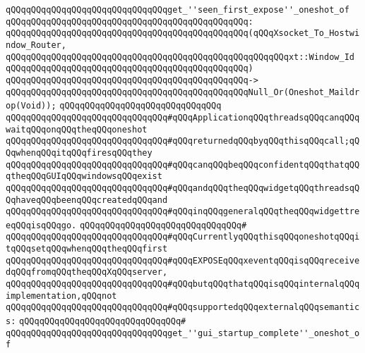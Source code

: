 \verb|qQQqqQQqqQQqqQQqqQQqqQQqqQQqqQQqget_''seen_first_expose''_oneshot_of|\newline
\verb|qQQqqQQqqQQqqQQqqQQqqQQqqQQqqQQqqQQqqQQqqQQqqQQq:|\newline
\verb|qQQqqQQqqQQqqQQqqQQqqQQqqQQqqQQqqQQqqQQqqQQqqQQq(qQQqXsocket_To_Hostwindow_Router,|\newline
\verb|qQQqqQQqqQQqqQQqqQQqqQQqqQQqqQQqqQQqqQQqqQQqqQQqqQQqqQQqxt::Window_Id|\newline
\verb|qQQqqQQqqQQqqQQqqQQqqQQqqQQqqQQqqQQqqQQqqQQqqQQq)|\newline
\verb|qQQqqQQqqQQqqQQqqQQqqQQqqQQqqQQqqQQqqQQqqQQqqQQq->|\newline
\verb|qQQqqQQqqQQqqQQqqQQqqQQqqQQqqQQqqQQqqQQqqQQqqQQqNull_Or(Oneshot_Maildrop(Void));|\newline
\newline
\verb|qQQqqQQqqQQqqQQqqQQqqQQqqQQqqQQq|\newline
\verb|qQQqqQQqqQQqqQQqqQQqqQQqqQQqqQQq#qQQqApplicationqQQqthreadsqQQqcanqQQqwaitqQQqonqQQqtheqQQqoneshot|\newline
\verb|qQQqqQQqqQQqqQQqqQQqqQQqqQQqqQQq#qQQqreturnedqQQqbyqQQqthisqQQqcall;qQQqwhenqQQqitqQQqfiresqQQqthey|\newline
\verb|qQQqqQQqqQQqqQQqqQQqqQQqqQQqqQQq#qQQqcanqQQqbeqQQqconfidentqQQqthatqQQqtheqQQqGUIqQQqwindowsqQQqexist|\newline
\verb|qQQqqQQqqQQqqQQqqQQqqQQqqQQqqQQq#qQQqandqQQqtheqQQqwidgetqQQqthreadsqQQqhaveqQQqbeenqQQqcreatedqQQqand|\newline
\verb|qQQqqQQqqQQqqQQqqQQqqQQqqQQqqQQq#qQQqinqQQqgeneralqQQqtheqQQqwidgettreeqQQqisqQQqgo.|\newline
\verb|qQQqqQQqqQQqqQQqqQQqqQQqqQQqqQQq#|\newline
\verb|qQQqqQQqqQQqqQQqqQQqqQQqqQQqqQQq#qQQqCurrentlyqQQqthisqQQqoneshotqQQqitqQQqsetqQQqwhenqQQqtheqQQqfirst|\newline
\verb|qQQqqQQqqQQqqQQqqQQqqQQqqQQqqQQq#qQQqEXPOSEqQQqxeventqQQqisqQQqreceivedqQQqfromqQQqtheqQQqXqQQqserver,|\newline
\verb|qQQqqQQqqQQqqQQqqQQqqQQqqQQqqQQq#qQQqbutqQQqthatqQQqisqQQqinternalqQQqimplementation,qQQqnot|\newline
\verb|qQQqqQQqqQQqqQQqqQQqqQQqqQQqqQQq#qQQqsupportedqQQqexternalqQQqsemantics:|\newline
\verb|qQQqqQQqqQQqqQQqqQQqqQQqqQQqqQQq#|\newline
\verb|qQQqqQQqqQQqqQQqqQQqqQQqqQQqqQQqget_''gui_startup_complete''_oneshot_of|\newline
